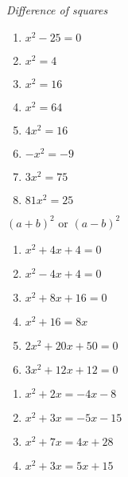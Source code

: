 {\em Difference of squares}
\begin{multicols}{2}
	\begin{enumerate}
		\item $x^2-25=0$ \solution{$\left\{\pm 5\right\}$}
		\item $x^2 = 4$ \solution{$\left\{\pm 2 \right\}$}
		\item $x^2 = 16$ \solution{$\left\{\pm 4\right\}$}
		\item $x^2 = 64$ \solution{$\left\{\pm 8\right\}$}
		\item $4x^2 = 16$ \solution{$\left\{\pm 2\right\}$}
		\item $-x^2 = -9$ \solution{$\left\{\pm 3\right\}$}
		\item $3x^2 = 75$ \solution{$\left\{\pm 5\right\}$}
		\item $81x^2 = 25$ 
	\end{enumerate}
\end{multicols}

{$(a+b)^2$ or $(a-b)^2$}
\begin{multicols}{2}
	\begin{enumerate}
		\item $x^2+4x+4 = 0$ \solution{$\left\{-2\right\}$}
		\item $x^2-4x+4 = 0$ \solution{$\left\{2\right\}$}
		\item $x^2+8x+16 = 0$ \solution{$\left\{-4\right\}$}
		\item $x^2+16 = 8x$ \solution{$\left\{4\right\}$}
		\item $2x^2+20x+50 = 0$ \solution{$\left\{-5\right\}$}
		\item $3x^2+12x+12=0$ \solution{$\left\{-2\right\}$}
	\end{enumerate}
\end{multicols}

\begin{multicols}{2}
	\begin{enumerate}
		\item $x^2+2x = -4x-8$ 
		\item $x^2+3x = -5x-15$ 
		\item $x^2+7x = 4x+28$ 
		\item $x^2+3x = 5x+15$ 
	\end{enumerate}
\end{multicols}


